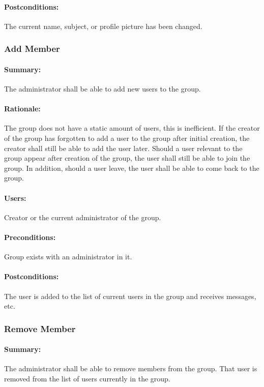 \documentclass[11pt]{article}
\begin{document}
\paragraph{{Postconditions:}}
The current name, subject, or profile picture has been changed.

\subsubsection{Add Member} \label{UC-add-member}
\paragraph{Summary:}
The administrator shall be able to add new users to the group.
\paragraph{Rationale:}
The group does not have a static amount of users, this is inefficient. If the creator of the group has forgotten to add a user to the group after initial creation, the creator shall still be able to add the user later. Should a user relevant to the group appear after creation of the group, the user shall still be able to join the group. In addition, should a user leave, the user shall be able to come back to the group.
\paragraph{Users:}
Creator or the current administrator of the group.
\paragraph{Preconditions:}
Group exists with an administrator in it.
\paragraph{{Postconditions:}}
The user is added to the list of current users in the group and receives messages, etc.

\subsubsection{Remove Member} \label{UC-remove-member}
\paragraph{Summary:}
The administrator shall be able to remove members from  the group. That user is removed from the list of users currently in the group.
\end{document}
